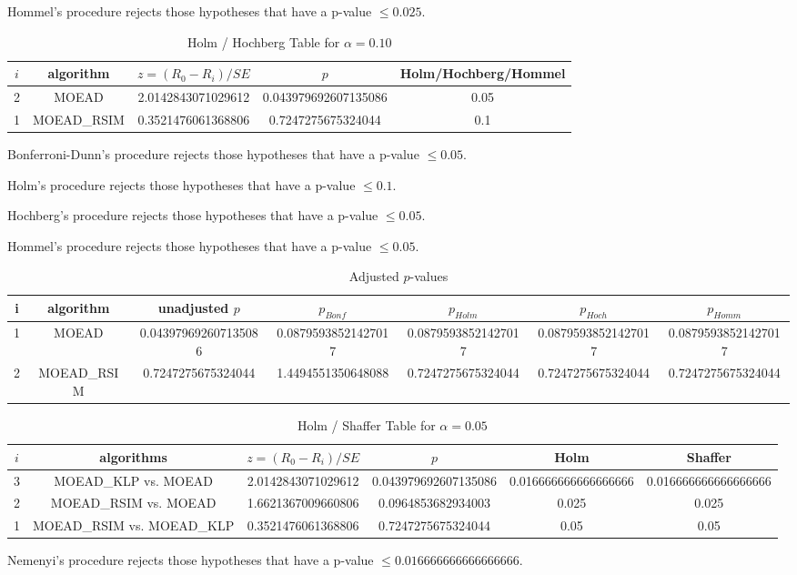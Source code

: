 \documentclass[a4paper,10pt]{article}
\begin{document}
\begin{landscape}
Hommel's procedure rejects those hypotheses that have a p-value $\le0.025$.


\begin{table}[!htp]
\centering\tiny
\caption{Holm / Hochberg Table for $\alpha=0.10$}
\begin{tabular}{ccccc}
$i$&algorithm&$z=(R_0 - R_i)/SE$&$p$&Holm/Hochberg/Hommel\\
\hline
2&MOEAD&2.0142843071029612&0.043979692607135086&0.05\\
1&MOEAD_RSIM&0.3521476061368806&0.7247275675324044&0.1\\
\hline
\end{tabular}
\end{table}
Bonferroni-Dunn's procedure rejects those hypotheses that have a p-value $\le0.05$.


Holm's procedure rejects those hypotheses that have a p-value $\le0.1$.


Hochberg's procedure rejects those hypotheses that have a p-value $\le0.05$.


Hommel's procedure rejects those hypotheses that have a p-value $\le0.05$.


\begin{table}[!htp]
\centering\tiny
\caption{Adjusted $p$-values}
\begin{tabular}{ccccccc}
i&algorithm&unadjusted $p$&$p_{Bonf}$&$p_{Holm}$&$p_{Hoch}$&$p_{Homm}$\\
\hline
1&MOEAD&0.043979692607135086&0.08795938521427017&0.08795938521427017&0.08795938521427017&0.08795938521427017\\
2&MOEAD_RSIM&0.7247275675324044&1.4494551350648088&0.7247275675324044&0.7247275675324044&0.7247275675324044\\
\hline
\end{tabular}
\end{table}

\begin{table}[!htp]
\centering\tiny
\caption{Holm / Shaffer Table for $\alpha=0.05$}
\begin{tabular}{cccccc}
$i$&algorithms&$z=(R_0 - R_i)/SE$&$p$&Holm&Shaffer\\
\hline
3&MOEAD_KLP vs. MOEAD&2.0142843071029612&0.043979692607135086&0.016666666666666666&0.016666666666666666\\
2&MOEAD_RSIM vs. MOEAD&1.6621367009660806&0.0964853682934003&0.025&0.025\\
1&MOEAD_RSIM vs. MOEAD_KLP&0.3521476061368806&0.7247275675324044&0.05&0.05\\
\hline
\end{tabular}
\end{table}
Nemenyi's procedure rejects those hypotheses that have a p-value $\le0.016666666666666666$.



\end{landscape}
\end{document}
